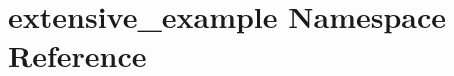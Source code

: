 \hypertarget{namespaceextensive__example}{\section{extensive\-\_\-example Namespace Reference}
\label{namespaceextensive__example}
}
